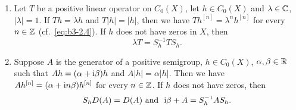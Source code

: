 \begin{theorem}\label{thm:b3-2.4}
\begin{enumerate}[\upshape (i)]	
\item
Let $T$ be a positive linear operator on $C_{0}(X)$, let $h \in C_{0}(X)$ and $\lambda \in \mathbb{C}$, $|\lambda| = 1$.
	If $Th = \lambda h$ and $T|h| = |h|$, then we have $Th^{[n]} = \lambda^{n}h^{[n]}$ for every $n \in \mathbb{Z}$ (cf.\ \eqref{eq:b3-2.4}).
	If $h$ does not have zeros in $X$, then 
	\[
	\lambda T = S_{h}^{-1}TS_{h}.
	\]
\item
Suppose $A$ is the generator of a positive semigroup, $h \in C_{0}(X)$, $\alpha,\beta \in \mathbb{R}$ such that $Ah = (\alpha+\mathrm{i}\beta )h$ and $A|h| = \alpha|h|$. 
	Then we have $Ah^{[n]} = (\alpha+\mathrm{i} n\beta)h^{[n]}$ for every $n \in \mathbb{Z}$.
	If $h$ does not have zeros, then 
	\[
	S_{h}D(A) = D(A) \text{ and \ } \mathrm{i}\beta + A = S_{h}^{-1}AS_{h}.
	\]
\end{enumerate}
\end{theorem}
